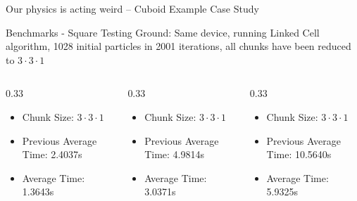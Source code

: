 \documentclass[aspectratio=169]{beamer}
\makeatletter
\newcommand{\blue}[1]{{\color{beamer@blendedblue} #1}}
\newcommand{\gray}[1]{{\color[HTML]{8F8F8F} #1}}
\makeatother
\begin{document}
\begin{frame}{Our physics is acting weird – Cuboid Example Case Study}
\begin{frame}[fragile]{Benchmarks - Square}
    \vspace{-0.5cm}
    \gray{Testing Ground:} Same device, running Linked Cell algorithm, 1028 initial particles in 2001 iterations, all chunks have been reduced to $3 \cdot 3 \cdot 1$
    \vspace{0.5cm}
    
    \begin{columns}
    \begin{column}{0.33\textwidth}
        \vspace{0.20cm}
        \begin{itemize}
            \item \blue{Chunk Size:} $3 \cdot 3 \cdot 1$
            \item \gray{Previous Average Time: 2.4037s}
            \item \blue{Average Time:} 1.3643s
        \end{itemize}
    \end{column}
    \begin{column}{0.33\textwidth}
        \vspace{0.20cm}
        \begin{itemize}
            \item \blue{Chunk Size:} $3 \cdot 3 \cdot 1$
            \item \gray{Previous Average Time: 4.9814s}
            \item \blue{Average Time:} 3.0371s
        \end{itemize}
    \end{column}
    \begin{column}{0.33\textwidth}
        \vspace{0.20cm}
        \begin{itemize}
            \item \blue{Chunk Size:} $3 \cdot 3 \cdot 1$
            \item \gray{Previous Average Time: 10.5640s}
            \item \blue{Average Time:} 5.9325s
        \end{itemize}
    \end{column}
    
    \end{columns}

\end{frame}


\end{frame}
\end{document}
